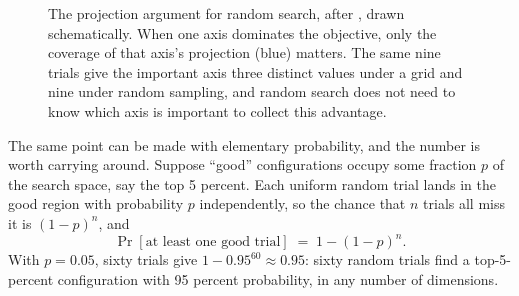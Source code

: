 \begin{figure}[t]
\centering
{}
\caption{The projection argument for random search, after
\citet{bergstra2012random}, drawn schematically. When one axis dominates the
objective, only the coverage of that axis's projection (blue) matters. The
same nine trials give the important axis three distinct values under a grid
and nine under random sampling, and random search does not need to know
which axis is important to collect this advantage.}
\label{fig:gridrandom}
\end{figure}

The same point can be made with elementary probability, and the number is
worth carrying around. Suppose ``good'' configurations occupy some fraction
$p$ of the search space, say the top 5 percent. Each uniform random trial
lands in the good region with probability $p$ independently, so the chance
that $n$ trials all miss it is $(1-p)^n$, and
\begin{equation}
\Pr[\text{at least one good trial}] \;=\; 1 - (1-p)^n .
\label{eq:coverage}
\end{equation}
With $p = 0.05$, sixty trials give $1 - 0.95^{60} \approx 0.95$: sixty
random trials find a top-5-percent configuration with 95 percent
probability, in any number of dimensions.

